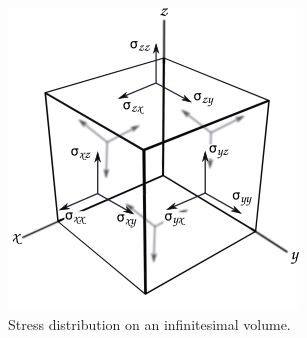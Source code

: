 \begin{figure}[h]
    \centering
    \includegraphics[width=0.39\linewidth, height=0.24\textheight]{Figures/cubefin.png}
    \caption{Stress distribution on an infinitesimal volume.}
    \label{fig:stress}
\end{figure}

